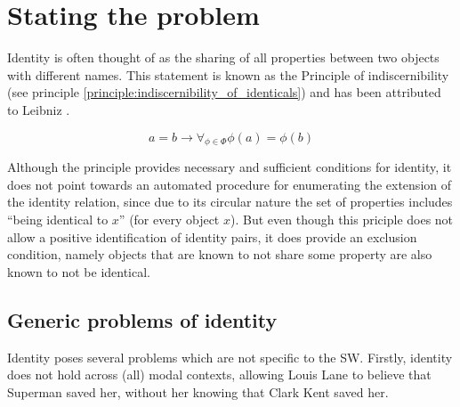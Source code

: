 \section{Stating the problem}
\label{sec:stating_the_problem}

Identity is often thought of as the sharing of all properties between
two objects with different names. 
This statement is known as the Principle of indiscernibility
(see principle \ref{principle:indiscernibility_of_identicals})
and has been attributed to Leibniz \cite{Forrest2010}.

\begin{principle}
\label{principle:indiscernibility_of_identicals}
\begin{equation}
    a = b
  \rightarrow
    \forall_{\phi \in \Phi} \phi(a) = \phi(b)\nonumber
\end{equation}
\end{principle}

\noindent Although the principle provides necessary and sufficient conditions
  for identity, it does not point towards an automated procedure
  for enumerating the extension of the identity relation,
  since due to its circular nature the set of properties includes
  ``being identical to $x$'' (for every object $x$).
But even though this priciple does not
  allow a positive identification of identity pairs,
  it does provide an exclusion condition,
  namely objects that are known to not share some property
  are also known to not be identical.

\subsection{Generic problems of identity}

Identity poses several problems which are not specific to the SW.
Firstly, identity does not hold across (all) modal contexts,
  allowing Louis Lane to believe that Superman saved her,
  without her knowing that Clark Kent saved her.

